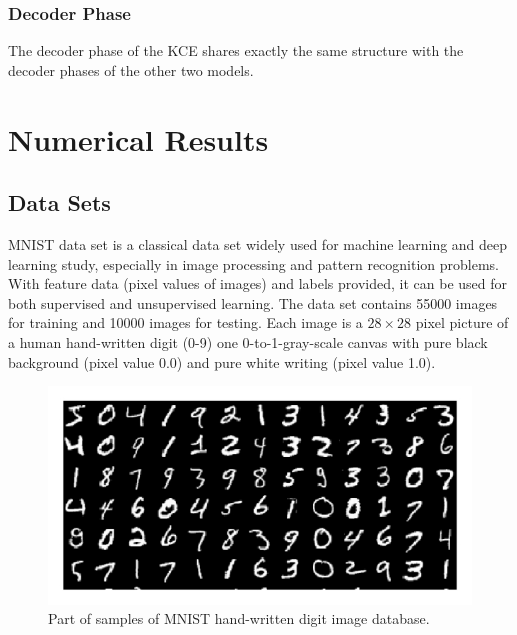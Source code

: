 \documentclass[12pt]{report} %
\begin{document}
\subsection{Decoder Phase}
The decoder phase of the KCE shares exactly the same structure with the decoder phases of the other two models. 

\chapter{Numerical Results}
\section{Data Sets}
MNIST data set\cite{MNIST} is a classical data set widely used for machine learning and deep learning study, especially in image processing and pattern recognition problems. With feature data (pixel values of images) and labels provided, it can be used for both supervised and unsupervised learning. The data set contains 55000 images for training and 10000 images for testing. Each image is a $28 \times 28$ pixel picture of a human hand-written digit (0-9) one 0-to-1-gray-scale canvas with pure black background (pixel value 0.0) and pure white writing (pixel value 1.0).
\begin{figure}[H]
	\centering
	\includegraphics[scale=2.0]{pictures/MNIST.png}
	\caption{Part of samples of MNIST hand-written digit image database\cite{MNISTPIC}.}
	\label{fig:1}
\end{figure}
\end{document}
